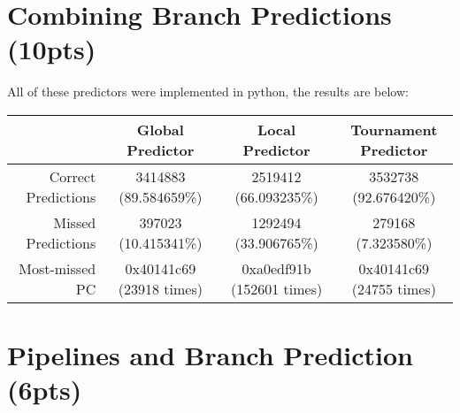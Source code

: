 \documentclass{article}
\begin{document}
\section{Combining Branch Predictions (10pts)}
All of these predictors were implemented in python, the results are below:
{\footnotesize
\begin{tabular}{| r | c | c | c |}
\hline
   & \bf{Global Predictor} & \bf{Local Predictor} & \bf{Tournament Predictor} \\\hline
Correct Predictions 	& 3414883 (89.584659\%)		& 2519412 (66.093235\%)		& 3532738 (92.676420\%) \\\hline
Missed Predictions 	& 397023 (10.415341\%)		& 1292494 (33.906765\%)		& 279168 (7.323580\%) \\\hline
Most-missed PC 	& 0x40141c69 (23918 times)	& 0xa0edf91b (152601 times)	& 0x40141c69 (24755 times)\\
\hline
\end{tabular}
}

\newpage

\section{Pipelines and Branch Prediction (6pts)}

\end{document}
